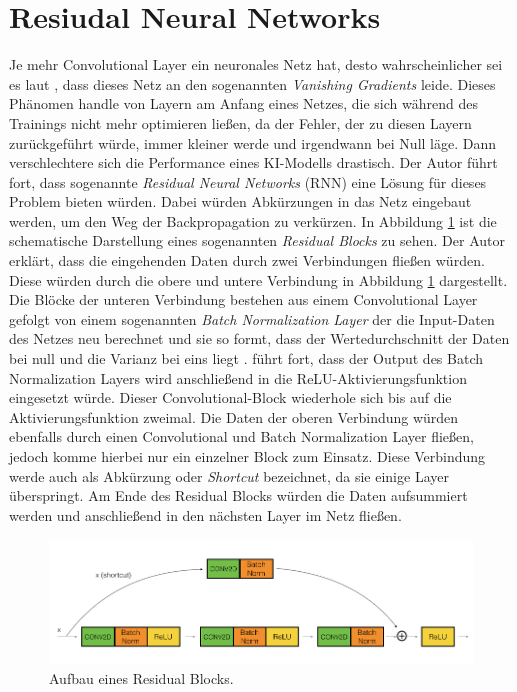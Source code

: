 \section{Resiudal Neural Networks}
Je mehr Convolutional Layer ein neuronales Netz hat, desto wahrscheinlicher sei es laut \citet[]{nandepu-2021}, dass dieses Netz an den sogenannten \textit{Vanishing Gradients} leide. Dieses Phänomen handle von Layern am Anfang eines Netzes, die sich während des Trainings nicht mehr optimieren ließen, da der Fehler, der zu diesen Layern zurückgeführt würde, immer kleiner werde und irgendwann bei Null läge. Dann verschlechtere sich die Performance eines KI-Modells drastisch. Der Autor führt fort, dass sogenannte \textit{Residual Neural Networks} (RNN) eine Lösung für dieses Problem bieten würden. Dabei würden Abkürzungen in das Netz eingebaut werden, um den Weg der Backpropagation zu verkürzen. In Abbildung \ref{resnet} ist die schematische Darstellung eines sogenannten \textit{Residual Blocks} zu sehen. Der Autor erklärt, dass die eingehenden Daten durch zwei Verbindungen fließen würden. Diese würden durch die obere und untere Verbindung in Abbildung \ref{resnet} dargestellt. Die Blöcke der unteren Verbindung bestehen aus einem Convolutional Layer gefolgt von einem sogenannten \textit{Batch Normalization Layer} der die Input-Daten des Netzes neu berechnet und sie so formt, dass der Wertedurchschnitt der Daten bei null und die Varianz bei eins liegt \parencite[]{batchnorm}. \citet[]{nandepu-2021} führt fort, dass der Output des Batch Normalization Layers wird anschließend in die ReLU-Aktivierungsfunktion eingesetzt würde. Dieser Convolutional-Block wiederhole sich bis auf die Aktivierungsfunktion zweimal. Die Daten der oberen Verbindung würden ebenfalls durch einen Convolutional und Batch Normalization Layer fließen, jedoch komme hierbei nur ein einzelner Block zum Einsatz. Diese Verbindung werde auch als Abkürzung oder \textit{Shortcut} bezeichnet, da sie einige Layer überspringt. Am Ende des Residual Blocks würden die Daten aufsummiert werden und anschließend in den nächsten Layer im Netz fließen.

\begin{figure}[ht]
    \centering
    \includegraphics[width=14cm]{bilder/resnet.png}
    \caption{Aufbau eines Residual Blocks.}
    \label{resnet}
\end{figure}

